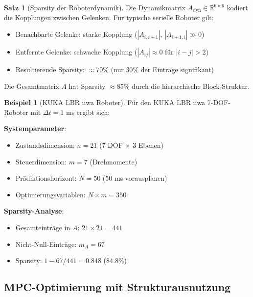 \documentclass[a4paper,12pt]{report}
\theoremstyle{definition}
\newtheorem{beispiel}{Beispiel}
\newtheorem{satz}{Satz}
\begin{document}
	\begin{satz}[Sparsity der Roboterdynamik]
		Die Dynamikmatrix $A_{\text{dyn}} \in \mathbb{R}^{6 \times 6}$ kodiert die Kopplungen zwischen Gelenken. Für typische serielle Roboter gilt:
		\begin{itemize}
			\item Benachbarte Gelenke: starke Kopplung ($|A_{i,i+1}|$, $|A_{i+1,i}| \gg 0$)
			\item Entfernte Gelenke: schwache Kopplung ($|A_{ij}| \approx 0$ für $|i-j| > 2$)
			\item Resultierende Sparsity: $\approx 70\%$ (nur $30\%$ der Einträge signifikant)
		\end{itemize}
		
		Die Gesamtmatrix $A$ hat Sparsity $\approx 85\%$ durch die hierarchische Block-Struktur.
	\end{satz}
	
	\begin{beispiel}[KUKA LBR iiwa Roboter]
		Für den KUKA LBR iiwa 7-DOF-Roboter mit $\Delta t = 1$ ms ergibt sich:
		
		\textbf{Systemparameter}:
		\begin{itemize}
			\item Zustandsdimension: $n = 21$ (7 DOF $\times$ 3 Ebenen)
			\item Steuerdimension: $m = 7$ (Drehmomente)
			\item Prädiktionshorizont: $N = 50$ (50 ms vorausplanen)
			\item Optimierungsvariablen: $N \times m = 350$
		\end{itemize}
		
		\textbf{Sparsity-Analyse}:
		\begin{itemize}
			\item Gesamteinträge in $A$: $21 \times 21 = 441$
			\item Nicht-Null-Einträge: $m_A = 67$
			\item Sparsity: $1 - 67/441 = 0.848$ (84.8\%)
		\end{itemize}
	\end{beispiel}
	
	\subsection{MPC-Optimierung mit Strukturausnutzung}
	
\end{document}
